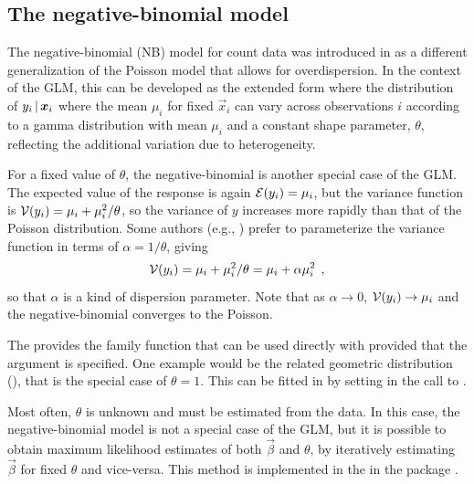 \documentclass[11pt]{book}\usepackage[]{graphicx}\usepackage[]{color}
\begin{document}
\subsection{The negative-binomial model}\label{sec:glm-negbin}

The negative-binomial (NB) model for count data was introduced in 
as a different generalization of the Poisson model that allows for overdispersion.
In the context of the GLM, this can be developed as the extended form where
the distribution of $y_i \, | \, \bm{x}_i$ where the mean $\mu_i$ for fixed
$\vec{x}_i$ can vary across observations $i$ according to a gamma distribution
with mean $\mu_i$ and a constant shape parameter, $\theta$, reflecting the
additional variation due to heterogeneity.

For a fixed value of $\theta$, the negative-binomial is another special case of
the GLM.
The expected value of the response is again
$\mathcal{E}(y_i) = \mu_i$, but the variance function is $\mathcal{V}(y_i) = \mu_i + \mu_i^2 / \theta$,
so the variance of $y$ increases more rapidly than that of the Poisson distribution.
Some authors (e.g., \citet{Agresti:2013,Hilbe:2014}) prefer to parameterize the variance
function in terms of $\alpha = 1/\theta$, giving
\begin{equation*}
\mathcal{V}(y_i) = \mu_i + \mu_i^2 / \theta = \mu_i + \alpha \mu_i^2 \:\: ,
\end{equation*}
so that $\alpha$ is a kind of dispersion parameter.  Note that as $\alpha \rightarrow 0$,
$\mathcal{V}(y_i) \rightarrow \mu_i$ and the negative-binomial converges to the Poisson.

The  provides the family function  that
can be used directly with  provided that the argument  is specified.
One example would be the related geometric distribution (),
that is the special case of $\theta=1$. This can be fitted in \R by setting
 in the call to .

Most often, $\theta$ is unknown and must be estimated from the data.
In this case, the negative-binomial model is not a special case of the GLM,
but it is possible to obtain maximum likelihood estimates of both
$\vec{\beta}$ and $\theta$, by iteratively estimating $\vec{\beta}$ for fixed $\theta$
and vice-versa. This method is implemented in the  in the package .
\end{document}
